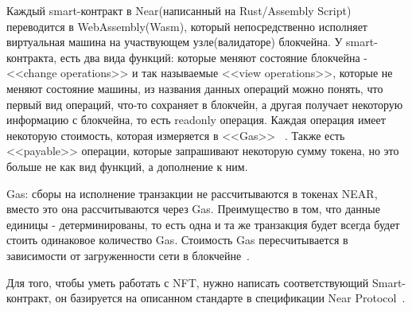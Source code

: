     Каждый smart-контракт в Near(написанный на Rust/Assembly Script) переводится в WebAssembly(Wasm), который непосредственно исполняет виртуальная машина на участвующем узле(валидаторе) блокчейна. У smart-контракта, есть два вида функций: которые меняют состояние блокчейна - <<change operations>> и так называемые <<view operations>>, которые не меняют состояние машины, из названия данных операций можно понять, что первый вид операций, что-то сохраняет в блокчейн, а другая получает некоторую информацию с блокчейна, то есть readonly операция. Каждая операция имеет некоторую стоимость, которая измеряется в <<Gas>> ~\cite*{ramamurthy2020blockchain, docsnear}. Также есть <<payable>> операции, которые запрашивают некоторую сумму токена, но это больше не как вид функций, а дополнение к ним.

    \begin{remark}
        Gas: сборы на исполнение транзакции не рассчитываются в токенах NEAR, вместо это она рассчитываются через Gas. Преимущество в том, что данные единицы - детерминированы, то есть одна и та же транзакция будет всегда будет стоить одинаковое количество Gas. Стоимость Gas пересчитывается в зависимости от загруженности сети в блокчейне~\cite*{docsnear}.
    \end{remark}

    Для того, чтобы уметь работать с NFT, нужно написать соответствующий Smart-контракт, он базируется на описанном стандарте в спецификации Near Protocol~\cite*{docsnear, nearspec}.

